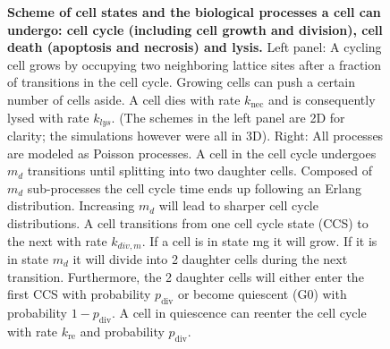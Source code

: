 \documentclass[10pt,letterpaper]{article}
\begin{document}
\begin{figure}[htbp]
\caption{{\bf Scheme of cell states and the biological processes a cell can undergo: cell cycle (including cell growth and division), cell death (apoptosis and necrosis) and lysis.}
 Left panel: A cycling cell grows by occupying two neighboring lattice sites after a fraction of transitions in the cell cycle. Growing cells can push a certain number of cells aside. A cell dies with rate $k_{\text{nec}}$ and is consequently lysed with rate $k_{lys}$. (The schemes in the left panel are 2D for clarity; the simulations however were all in 3D). Right: All processes are modeled as Poisson processes. A cell in the cell cycle undergoes $m_d$ transitions until splitting into two daughter cells. Composed of $m_d$ sub-processes the cell cycle time ends up following an Erlang distribution. Increasing $m_d$ will lead to sharper cell cycle distributions. A cell transitions from one cell cycle state (CCS) to the next with rate $k_{div,m}$. If a cell is in state mg it will grow. If it is in state $m_d$ it will divide into 2 daughter cells during the next transition. Furthermore, the 2 daughter cells will either enter the first CCS with probability $p_{\text{div}}$ or become quiescent (G0) with probability $1 - p_{\text{div}}$. A cell in quiescence can reenter the cell cycle with rate $k_{\text{re}}$ and probability $p_{\text{div}}$.
}
\label{fig:cell-states}
\end{figure}
\end{document}
